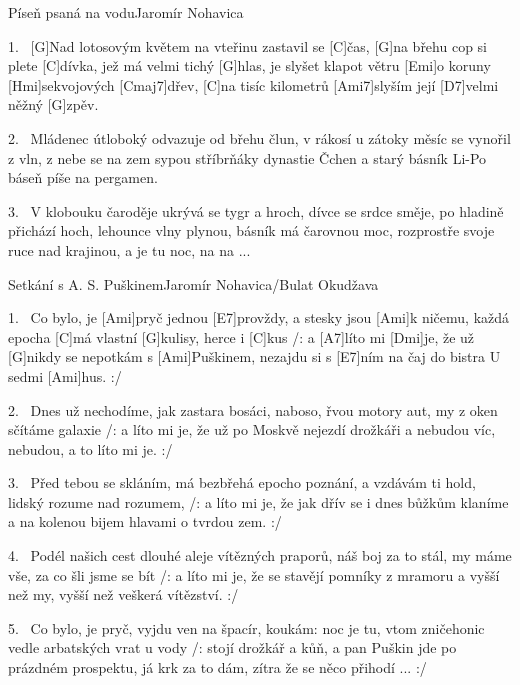 \begin{song}{Píseň psaná na vodu}{Jaromír Nohavica}

\begin{xverse}{1.~}
[G]Nad lotosovým květem na vteřinu zastavil se [C]{čas},
[G]na břehu cop si plete [C]dívka, jež má velmi tichý [G]hlas,
je slyšet klapot větru [Emi]o koruny [Hmi]sekvojových [Cmaj7]dřev,
[C]na tisíc kilometrů [Ami7]slyším její [D7]velmi něžný [G]zpěv.
\end{xverse}

\begin{xverse}{2.~}
Mládenec útloboký odvazuje od břehu člun,
v rákosí u zátoky měsíc se vynořil z vln,
z nebe se na zem sypou stříbrňáky dynastie Čchen
a starý básník Li-Po báseň píše na pergamen.
\end{xverse}

\begin{xverse}{3.~}
V klobouku čaroděje ukrývá se tygr a hroch,
dívce se srdce směje, po hladině přichází hoch,
lehounce vlny plynou, básník má čarovnou moc,
rozprostře svoje ruce nad krajinou, a je tu noc, na na ...
\end{xverse}

\end{song}

\begin{song}{Setkání s A. S. Puškinem}{Jaromír Nohavica/Bulat Okudžava}

\begin{xverse}{1.~}
Co bylo, je [Ami]pryč jednou [E7]provždy, a stesky jsou [Ami]k ničemu,
každá epocha [C]má vlastní [G]kulisy, herce i [C]kus
/: a [A7]líto mi [Dmi]je, že už [G]nikdy se nepotkám s [Ami]Puškinem,
nezajdu si s [E7]ním na čaj do bistra U sedmi [Ami]hus. :/
\end{xverse}

\begin{xverse}{2.~}
Dnes už nechodíme, jak zastara bosáci, naboso,
řvou motory aut, my z oken sčítáme galaxie
/: a líto mi je, že už po Moskvě nejezdí drožkáři
a nebudou víc, nebudou, a to líto mi je. :/
\end{xverse}

\begin{xverse}{3.~}
Před tebou se skláním, má bezbřehá epocho poznání,
a vzdávám ti hold, lidský rozume nad rozumem,
/: a líto mi je, že jak dřív se i dnes bůžkům klaníme
a na kolenou bijem hlavami o tvrdou zem. :/
\end{xverse}

\begin{xverse}{4.~}
Podél našich cest dlouhé aleje vítězných praporů,
náš boj za to stál, my máme vše, za co šli jsme se bít
/: a líto mi je, že se stavějí pomníky z mramoru
a vyšší než my, vyšší než veškerá vítězství. :/
\end{xverse}

\begin{xverse}{5.~}
Co bylo, je pryč, vyjdu ven na špacír, koukám: noc je tu,
vtom zničehonic vedle arbatských vrat u vody
/: stojí drožkář a kůň, a pan Puškin jde po prázdném prospektu,
já krk za to dám, zítra že se něco přihodí ... :/
\end{xverse}

\end{song}


